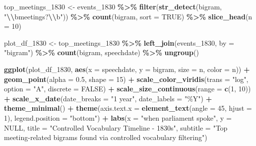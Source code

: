\documentclass[
]{article}
\newenvironment{Shaded}{\begin{snugshade}}{\end{snugshade}}
\newcommand{\AttributeTok}[1]{\textcolor[rgb]{0.13,0.29,0.53}{#1}}
\newcommand{\ConstantTok}[1]{\textcolor[rgb]{0.56,0.35,0.01}{#1}}
\newcommand{\DecValTok}[1]{\textcolor[rgb]{0.00,0.00,0.81}{#1}}
\newcommand{\FloatTok}[1]{\textcolor[rgb]{0.00,0.00,0.81}{#1}}
\newcommand{\FunctionTok}[1]{\textcolor[rgb]{0.13,0.29,0.53}{\textbf{#1}}}
\newcommand{\NormalTok}[1]{#1}
\newcommand{\OtherTok}[1]{\textcolor[rgb]{0.56,0.35,0.01}{#1}}
\newcommand{\SpecialCharTok}[1]{\textcolor[rgb]{0.81,0.36,0.00}{\textbf{#1}}}
\newcommand{\StringTok}[1]{\textcolor[rgb]{0.31,0.60,0.02}{#1}}
\begin{document}
\begin{Shaded}
\begin{Highlighting}[]
\NormalTok{top\_meetings\_1830 }\OtherTok{\textless{}{-}}\NormalTok{ events\_1830 }\SpecialCharTok{\%\textgreater{}\%}
  \FunctionTok{filter}\NormalTok{(}\FunctionTok{str\_detect}\NormalTok{(bigram, }\StringTok{"}\SpecialCharTok{\textbackslash{}\textbackslash{}}\StringTok{bmeetings?}\SpecialCharTok{\textbackslash{}\textbackslash{}}\StringTok{b"}\NormalTok{)) }\SpecialCharTok{\%\textgreater{}\%}
  \FunctionTok{count}\NormalTok{(bigram, }\AttributeTok{sort =} \ConstantTok{TRUE}\NormalTok{) }\SpecialCharTok{\%\textgreater{}\%}
  \FunctionTok{slice\_head}\NormalTok{(}\AttributeTok{n =} \DecValTok{10}\NormalTok{)}

\NormalTok{plot\_df\_1830 }\OtherTok{\textless{}{-}}\NormalTok{ top\_meetings\_1830 }\SpecialCharTok{\%\textgreater{}\%}
  \FunctionTok{left\_join}\NormalTok{(events\_1830, }\AttributeTok{by =} \StringTok{"bigram"}\NormalTok{) }\SpecialCharTok{\%\textgreater{}\%}
  \FunctionTok{count}\NormalTok{(bigram, speechdate) }\SpecialCharTok{\%\textgreater{}\%}
  \FunctionTok{ungroup}\NormalTok{()}

\FunctionTok{ggplot}\NormalTok{(plot\_df\_1830, }\FunctionTok{aes}\NormalTok{(}\AttributeTok{x =}\NormalTok{ speechdate, }\AttributeTok{y =}\NormalTok{ bigram, }\AttributeTok{size =}\NormalTok{ n, }\AttributeTok{color =}\NormalTok{ n)) }\SpecialCharTok{+}
  \FunctionTok{geom\_point}\NormalTok{(}\AttributeTok{alpha =} \FloatTok{0.5}\NormalTok{, }\AttributeTok{shape =} \DecValTok{15}\NormalTok{) }\SpecialCharTok{+}
  \FunctionTok{scale\_color\_viridis}\NormalTok{(}\AttributeTok{trans =} \StringTok{"log"}\NormalTok{, }\AttributeTok{option =} \StringTok{"A"}\NormalTok{, }\AttributeTok{discrete =} \ConstantTok{FALSE}\NormalTok{) }\SpecialCharTok{+}
  \FunctionTok{scale\_size\_continuous}\NormalTok{(}\AttributeTok{range =} \FunctionTok{c}\NormalTok{(}\DecValTok{1}\NormalTok{, }\DecValTok{10}\NormalTok{)) }\SpecialCharTok{+}
  \FunctionTok{scale\_x\_date}\NormalTok{(}\AttributeTok{date\_breaks =} \StringTok{"1 year"}\NormalTok{, }\AttributeTok{date\_labels =} \StringTok{"\%Y"}\NormalTok{) }\SpecialCharTok{+}
  \FunctionTok{theme\_minimal}\NormalTok{() }\SpecialCharTok{+}
  \FunctionTok{theme}\NormalTok{(}\AttributeTok{axis.text.x =} \FunctionTok{element\_text}\NormalTok{(}\AttributeTok{angle =} \DecValTok{45}\NormalTok{, }\AttributeTok{hjust =} \DecValTok{1}\NormalTok{),}
        \AttributeTok{legend.position =} \StringTok{"bottom"}\NormalTok{) }\SpecialCharTok{+}
  \FunctionTok{labs}\NormalTok{(}\AttributeTok{x =} \StringTok{"when parliament spoke"}\NormalTok{, }\AttributeTok{y =} \ConstantTok{NULL}\NormalTok{,}
       \AttributeTok{title =} \StringTok{"Controlled Vocabulary Timeline {-} 1830s"}\NormalTok{,}
       \AttributeTok{subtitle =} \StringTok{"Top meeting{-}related bigrams found via controlled vocabulary filtering"}\NormalTok{)}
\end{Highlighting}
\end{Shaded}
\end{document}
